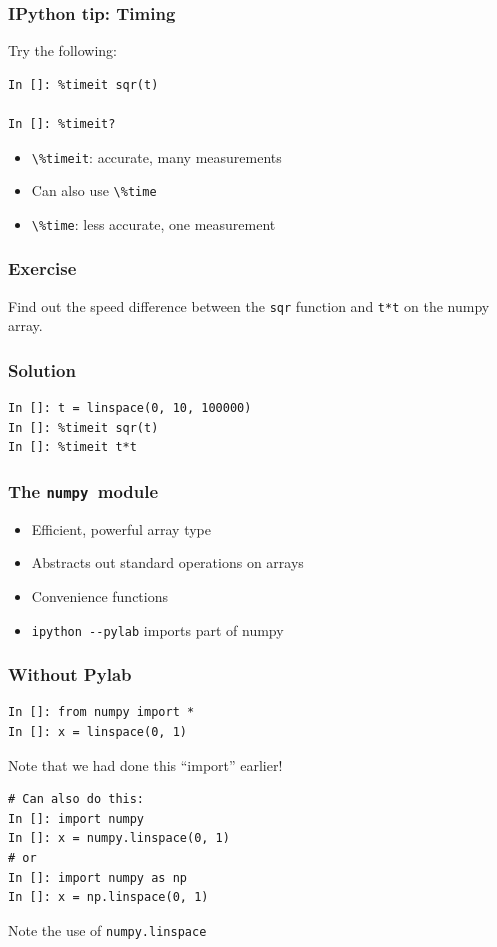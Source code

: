 \documentclass[14pt,compress]{beamer}
\newcounter{time}
\newcommand{\inctime}[1]{\addtocounter{time}{#1}{\tiny \thetime\ m}}
\newcommand{\typ}[1]{\lstinline{#1}}
\newcommand{\num}{\texttt{numpy}}
\begin{document}
\begin{frame}[fragile]
  \frametitle{IPython tip: Timing}

Try the following:
  \begin{lstlisting}
In []: %timeit sqr(t)

In []: %timeit?

  \end{lstlisting}

  \begin{itemize}
      \item \typ{\%timeit}: accurate, many measurements
      \item Can also use \typ{\%time}
      \item \typ{\%time}: less accurate, one measurement
  \end{itemize}

\inctime{10}
\end{frame}


\begin{frame}[fragile]
\frametitle{Exercise}
\begin{center}
    Find out the speed difference between the \typ{sqr} function and
    \typ{t*t} on the numpy array.
\end{center}

\end{frame}

\begin{frame}[fragile]
  \frametitle{Solution}
\begin{lstlisting}
In []: t = linspace(0, 10, 100000)
In []: %timeit sqr(t)
In []: %timeit t*t
\end{lstlisting}
  \inctime{5}
\end{frame}

\begin{frame}[fragile]
  \frametitle{The \num\ module}
  \begin{itemize}
  \item Efficient, powerful array type
  \item Abstracts out standard operations on arrays
  \item Convenience functions
  \item \typ{ipython --pylab} imports part of numpy
  \end{itemize}
\end{frame}

\begin{frame}[fragile]
  \frametitle{Without Pylab}
\begin{lstlisting}
In []: from numpy import *
In []: x = linspace(0, 1)
\end{lstlisting}
  Note that we had done this ``import'' earlier!
\begin{lstlisting}
# Can also do this:
In []: import numpy
In []: x = numpy.linspace(0, 1)
# or
In []: import numpy as np
In []: x = np.linspace(0, 1)
\end{lstlisting}
  Note the use of \typ{numpy.linspace}
\end{frame}
\end{document}
